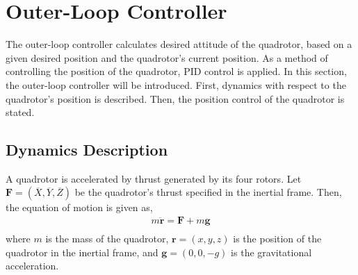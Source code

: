 \section{Outer-Loop Controller}
\label{sec:outer_loop}

The outer-loop controller calculates desired attitude of the quadrotor, based on a given desired position and the quadrotor's current position. As a method of controlling the position of the quadrotor, PID control is applied. In this section, the outer-loop controller will be introduced. First, dynamics with respect to the quadrotor's position is described. Then, the position control of the quadrotor is stated.

\subsection{Dynamics Description}

A quadrotor is accelerated by thrust generated by its four rotors. Let \( {\boldsymbol F} = (\overline{X}, \overline{Y}, \overline{Z})\) be the quadrotor's thrust specified in the inertial frame. Then, the equation of motion is given as,
\begin{equation}
\label{eq:newton}
\begin{aligned}
m \ddot{{\boldsymbol{r}}} = \boldsymbol{F} + m \boldsymbol{g}\\
\end{aligned}
\end{equation}
where \(m\) is the mass of the quadrotor, \({\boldsymbol r} = (x, y, z)\) is the position of the quadrotor in the inertial frame, and \(\boldsymbol{g} = (0, 0, -g)\) is the gravitational acceleration.

